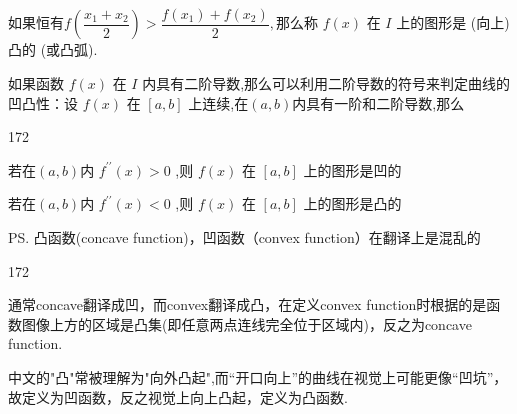 如果恒有$f\left( \dfrac{{x}_{1} + {x}_{2}}{2}\right)  > \dfrac{f\left( {x}_{1}\right)  + f\left( {x}_{2}\right) }{2},$那么称 $f\left( x\right)$ 在 $I$ 上的图形是 (向上) 凸的 (或凸弧).


如果函数 $f\left( x\right)$ 在 $I$ 内具有二阶导数,那么可以利用二阶导数的符号来判定曲线的凹凸性：设 $f\left( x\right)$ 在 $\left\lbrack  {a,b}\right\rbrack$ 上连续,在$(a,b)$内具有一阶和二阶导数,那么
\begin{dingautolist}{172}
    \item 若在$(a,b)$内 ${f}^{\prime \prime }\left( x\right)  > 0$ ,则 $f\left( x\right)$ 在 $\left\lbrack  {a,b}\right\rbrack$ 上的图形是凹的
    \item 若在$(a,b)$内 ${f}^{\prime \prime }\left( x\right)  < 0$ ,则 $f\left( x\right)$ 在 $\left\lbrack  {a,b}\right\rbrack$ 上的图形是凸的
\end{dingautolist}

\ps 凸函数(concave function)，凹函数（convex function）在翻译上是混乱的
\begin{dingautolist}{172}
    \item 通常concave翻译成凹，而convex翻译成凸，在定义convex function时根据的是函数图像上方的区域是凸集(即任意两点连线完全位于区域内)，反之为concave function.
    \item 中文的"凸"常被理解为"向外凸起",而“开口向上”的曲线在视觉上可能更像“凹坑”，故定义为凹函数，反之视觉上向上凸起，定义为凸函数.
\end{dingautolist}

